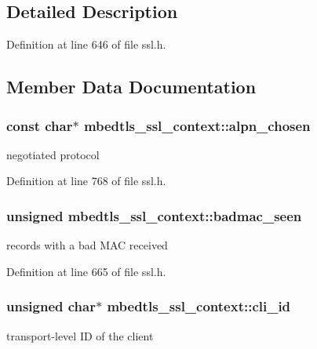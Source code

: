 \subsection{Detailed Description}


Definition at line 646 of file ssl.\-h.



\subsection{Member Data Documentation}
\hypertarget{structmbedtls__ssl__context_a858fd8077042db3804cd2e4aef9e2f20}{
\subsubsection[{alpn\-\_\-chosen}]{\setlength{\rightskip}{0pt plus 5cm}const char$\ast$ mbedtls\-\_\-ssl\-\_\-context\-::alpn\-\_\-chosen}}\label{structmbedtls__ssl__context_a858fd8077042db3804cd2e4aef9e2f20}
negotiated protocol 

Definition at line 768 of file ssl.\-h.

\hypertarget{structmbedtls__ssl__context_ade2a10fc444a50b44a2caee1312d5b7e}{
\subsubsection[{badmac\-\_\-seen}]{\setlength{\rightskip}{0pt plus 5cm}unsigned mbedtls\-\_\-ssl\-\_\-context\-::badmac\-\_\-seen}}\label{structmbedtls__ssl__context_ade2a10fc444a50b44a2caee1312d5b7e}
records with a bad M\-A\-C received 

Definition at line 665 of file ssl.\-h.

\hypertarget{structmbedtls__ssl__context_a25bf8a5a798a1082db3b1e0f40de6161}{
\subsubsection[{cli\-\_\-id}]{\setlength{\rightskip}{0pt plus 5cm}unsigned char$\ast$ mbedtls\-\_\-ssl\-\_\-context\-::cli\-\_\-id}}\label{structmbedtls__ssl__context_a25bf8a5a798a1082db3b1e0f40de6161}
transport-\/level I\-D of the client 


